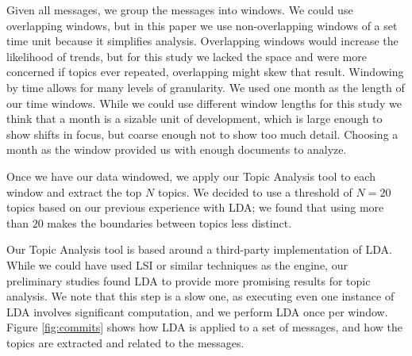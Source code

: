 \documentclass[times, 10pt,twocolumn]{article}
\newcommand{\shrinkit}{\vspace*{-.3em}}
\begin{document}

\shrinkit
{}
\shrinkit


Given all messages, we group the messages into windows. We could use
overlapping windows, but in this paper we use non-overlapping windows
of a set time unit because it simplifies analysis.  
Overlapping windows would 
increase the likelihood of trends, 
but for this
study we lacked the space and were more concerned if topics ever
repeated, overlapping might skew that result.
Windowing by time
allows for many levels of granularity.  
We used one month as the
length of our time windows. While we could use different window
lengths for this study we think that a month is a sizable unit of
development, which is large enough to show shifts in focus, but coarse
enough not to show too much detail. Choosing a month as the window
provided us with enough documents to analyze. 


\shrinkit
{}
\shrinkit

Once we have our data windowed, we apply our Topic Analysis tool to
each window and extract the top $N$ topics.  We decided to use a
threshold of $N=20$ topics based on our previous experience with LDA; we
found that using more than $20$ makes the boundaries between topics less
distinct.


Our Topic Analysis tool is based around a third-party implementation
of LDA.  While we could have used LSI or similar techniques as the
engine, our preliminary studies found LDA to provide more promising
results for topic analysis.  We note that this step is a slow one, as
executing even one instance of LDA involves significant computation,
and we perform LDA once per window.  Figure \ref{fig:commits} shows
how LDA is applied to a set of messages, and how the topics are
extracted and related to the messages.





\shrinkit
{}
\shrinkit
\end{document}

